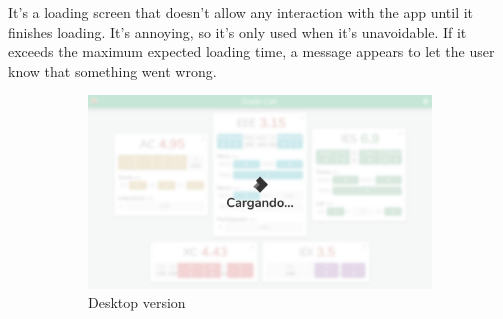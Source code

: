 It's a loading screen that doesn't allow any interaction with the app until it finishes loading. It's annoying, so it's only used when it's unavoidable. If it exceeds the maximum expected loading time, a message appears to let the user know that something went wrong.


\vfill
\begin{figure}[ht!]
    \begin{subfigure}[b]{0.757\textwidth-0.1cm}
        \centering
        \includegraphics[frame,width=\textwidth]{media/screenshots/screenshot-froozen-pc.png}
        \caption{Desktop version}
    \end{subfigure}
    \hfill
    \begin{subfigure}[b]{0.243\textwidth-0.1cm}
        \centering

\end{subfigure}
\end{figure}
